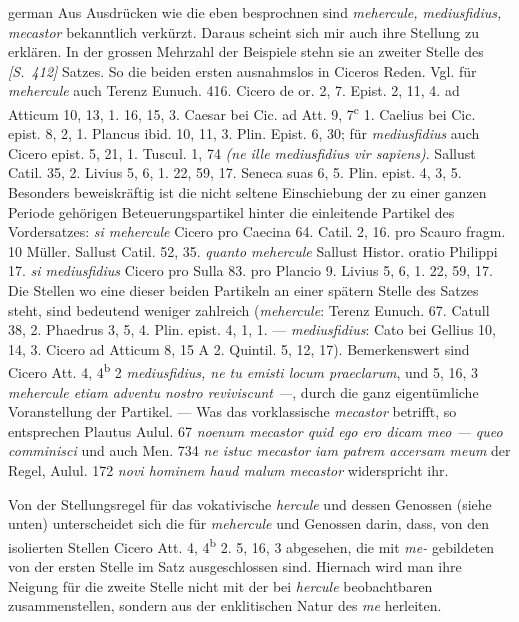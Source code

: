 \begin{otherlanguage*}{german}
Aus Ausdrücken wie die eben besprochnen sind \emph{mehercule, mediusfidius, mecastor} bekanntlich verkürzt. Daraus scheint sich mir auch ihre Stellung zu erklären. In der grossen Mehrzahl der Beispiele stehn sie an zweiter Stelle des \hypertarget{p412}{\emph{[S.~412]}}\label{p412} Satzes. So die beiden ersten ausnahmslos in Ciceros Reden. Vgl. für \emph{mehercule} auch Terenz Eunuch. 416. Cicero de or. 2, 7. Epist. 2, 11, 4. ad Atticum 10, 13, 1. 16, 15, 3. Caesar bei Cic. ad Att. 9, 7\textsuperscript{c} 1. Caelius bei Cic. epist. 8, 2, 1. Plancus ibid. 10, 11, 3. Plin. Epist. 6, 30; für \emph{mediusfidius} auch Cicero epist. 5, 21, 1. Tuscul. 1, 74 \emph{(ne ille mediusfidius vir sapiens)}. Sallust Catil. 35, 2. Livius 5, 6, 1. 22, 59, 17. Seneca suas 6, 5. Plin. epist. 4, 3, 5. Besonders beweiskräftig ist die nicht seltene Einschiebung der zu einer ganzen Periode gehörigen Beteuerungspartikel hinter die einleitende Partikel des Vordersatzes: \emph{si mehercule} Cicero pro Caecina 64. Catil. 2, 16. pro Scauro fragm. 10 Müller. Sallust Catil. 52, 35. \emph{quanto mehercule} Sallust Histor. oratio Philippi 17. \emph{si mediusfidius} Cicero pro Sulla 83. pro Plancio 9. Livius 5, 6, 1. 22, 59, 17. Die Stellen wo eine dieser beiden Partikeln an einer spätern Stelle des Satzes steht, sind bedeutend weniger zahlreich (\emph{mehercule}: Terenz Eunuch. 67. Catull 38, 2. Phaedrus 3, 5, 4. Plin. epist. 4, 1, 1. — \emph{mediusfidius}: Cato bei Gellius 10, 14, 3. Cicero ad Atticum 8, 15 A 2. Quintil. 5, 12, 17). Bemerkenswert sind Cicero Att. 4, 4\textsuperscript{b} 2 \emph{mediusfidius, ne tu emisti locum praeclarum}, und 5, 16, 3 \emph{mehercule etiam adventu nostro reviviscunt —}, durch die ganz eigentümliche Voranstellung der Partikel. — Was das vorklassische \emph{mecastor} betrifft, so entsprechen Plautus Aulul. 67 \emph{noenum mecastor quid ego ero dicam meo — queo comminisci} und auch Men. 734 \emph{ne istuc mecastor iam patrem accersam meum} der Regel, Aulul. 172 \emph{novi hominem haud malum mecastor} widerspricht ihr.

Von der Stellungsregel für das vokativische \emph{hercule} und dessen Genossen (sie\-he unten) unterscheidet sich die für \emph{mehercule} und Genossen darin, dass, von den isolierten Stellen Cicero Att. 4, 4\textsuperscript{b} 2. 5, 16, 3 abgesehen, die mit \emph{me-} gebildeten von der ersten Stelle im Satz ausgeschlossen sind. Hiernach wird man ihre Neigung für die zweite Stelle nicht mit der bei \emph{hercule} beobachtbaren zusammenstellen, sondern aus der enklitischen Natur des \emph{me} herleiten.


\end{otherlanguage*}
